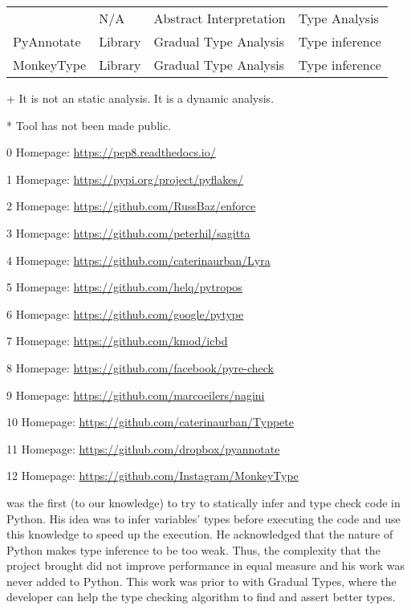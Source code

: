 \begin{sidewaystable}[p]
\begin{threeparttable}
\begin{longtable}[]{|l|l|l|l|}
    \textcite{monat_static_2018}\tnote{*}                & N/A     & Abstract Interpretation & Type Analysis               \tabularnewline
    PyAnnotate\tnote{+}\tnote{11}                        & Library & Gradual Type Analysis   & Type inference              \tabularnewline
    MonkeyType\tnote{+}\tnote{12}                        & Library & Gradual Type Analysis   & Type inference              \tabularnewline
  \bottomrule
\end{longtable}
\begin{tablenotes}
  \item[+] \footnotesize It is not an static analysis. It is a dynamic analysis.
  \item[*] Tool has not been made public.
  \item[0] Homepage: \url{https://pep8.readthedocs.io/}
  \item[1] Homepage: \url{https://pypi.org/project/pyflakes/}
  \item[2] Homepage: \url{https://github.com/RussBaz/enforce}
  \item[3] Homepage: \url{https://github.com/peterhil/sagitta}
  \item[4] Homepage: \url{https://github.com/caterinaurban/Lyra}
  \item[5] Homepage: \url{https://github.com/helq/pytropos}
  \item[6] Homepage: \url{https://github.com/google/pytype}
  \item[7] Homepage: \url{https://github.com/kmod/icbd}
  \item[8] Homepage: \url{https://github.com/facebook/pyre-check}
  \item[9] Homepage: \url{https://github.com/marcoeilers/nagini}
  \item[10] Homepage: \url{https://github.com/caterinaurban/Typpete}
  \item[11] Homepage: \url{https://github.com/dropbox/pyannotate}
  \item[12] Homepage: \url{https://github.com/Instagram/MonkeyType}
\end{tablenotes}
\end{threeparttable}
\end{sidewaystable}

\textcite{cannon_localized_2005} was the first (to our knowledge) to try to statically
infer and type check code in Python. His idea was to infer variables' types before
executing the code and use this knowledge to speed up the execution. He acknowledged that
the nature of Python makes type inference to be too weak. Thus, the complexity that the
project brought did not improve performance in equal measure and his work was never added
to Python. This work was prior to \textcite{siek_gradual_2006} with Gradual Types, where the
developer can help the type checking algorithm to find and assert better types.

